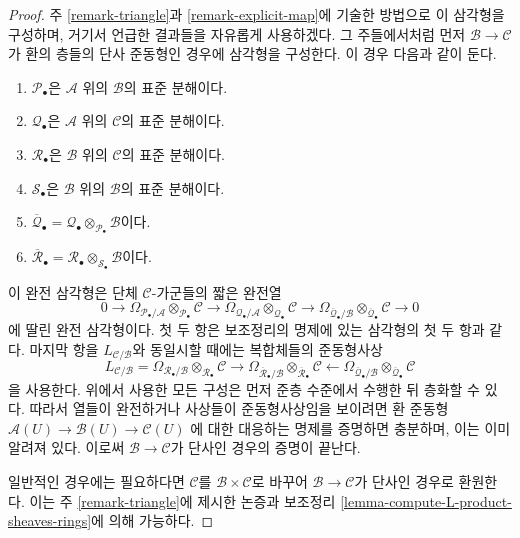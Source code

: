 \begin{proof}
주 \ref{remark-triangle}과 \ref{remark-explicit-map}에 기술한 방법으로 이
삼각형을 구성하며, 거기서 언급한 결과들을 자유롭게 사용하겠다. 그
주들에서처럼 먼저 $\mathcal{B} \to \mathcal{C}$가 환의 층들의 단사
준동형인 경우에 삼각형을 구성한다. 이 경우 다음과 같이 둔다.
\begin{enumerate}
\item $\mathcal{P}_\bullet$은 $\mathcal{A}$ 위의 $\mathcal{B}$의 표준 분해이다.
\item $\mathcal{Q}_\bullet$은 $\mathcal{A}$ 위의 $\mathcal{C}$의 표준 분해이다.
\item $\mathcal{R}_\bullet$은 $\mathcal{B}$ 위의 $\mathcal{C}$의 표준 분해이다.
\item $\mathcal{S}_\bullet$은 $\mathcal{B}$ 위의 $\mathcal{B}$의 표준 분해이다.
\item $\overline{\mathcal{Q}}_\bullet =
\mathcal{Q}_\bullet \otimes_{\mathcal{P}_\bullet} \mathcal{B}$이다.
\item $\overline{\mathcal{R}}_\bullet =
\mathcal{R}_\bullet \otimes_{\mathcal{S}_\bullet} \mathcal{B}$이다.
\end{enumerate}
이 완전 삼각형은 단체 $\mathcal{C}$-가군들의 짧은 완전열
$$
0 \to
\Omega_{\mathcal{P}_\bullet/\mathcal{A}}
\otimes_{\mathcal{P}_\bullet} \mathcal{C} \to
\Omega_{\mathcal{Q}_\bullet/\mathcal{A}}
\otimes_{\mathcal{Q}_\bullet} \mathcal{C} \to
\Omega_{\overline{\mathcal{Q}}_\bullet/\mathcal{B}}
\otimes_{\overline{\mathcal{Q}}_\bullet} \mathcal{C} \to 0
$$
에 딸린 완전 삼각형이다. 첫 두 항은 보조정리의 명제에 있는 삼각형의
첫 두 항과 같다. 마지막 항을 $L_{\mathcal{C}/\mathcal{B}}$와 동일시할
때에는 복합체들의 준동형사상
$$
L_{\mathcal{C}/\mathcal{B}} =
\Omega_{\mathcal{R}_\bullet/\mathcal{B}}
\otimes_{\mathcal{R}_\bullet} \mathcal{C}
\longrightarrow
\Omega_{\overline{\mathcal{R}}_\bullet/\mathcal{B}}
\otimes_{\overline{\mathcal{R}}_\bullet} \mathcal{C}
\longleftarrow
\Omega_{\overline{\mathcal{Q}}_\bullet/\mathcal{B}}
\otimes_{\overline{\mathcal{Q}}_\bullet} \mathcal{C}
$$
을 사용한다. 위에서 사용한 모든 구성은 먼저 준층 수준에서 수행한 뒤
층화할 수 있다. 따라서 열들이 완전하거나 사상들이 준동형사상임을
보이려면 환 준동형
$\mathcal{A}(U) \to \mathcal{B}(U) \to \mathcal{C}(U)$
에 대한 대응하는 명제를 증명하면 충분하며, 이는 이미 알려져 있다.
이로써 $\mathcal{B} \to \mathcal{C}$가 단사인 경우의 증명이 끝난다.

\medskip\noindent
일반적인 경우에는 필요하다면 $\mathcal{C}$를
$\mathcal{B} \times \mathcal{C}$로 바꾸어
$\mathcal{B} \to \mathcal{C}$가 단사인 경우로 환원한다. 이는 주
\ref{remark-triangle}에 제시한 논증과 보조정리
\ref{lemma-compute-L-product-sheaves-rings}에 의해 가능하다.
\end{proof}

